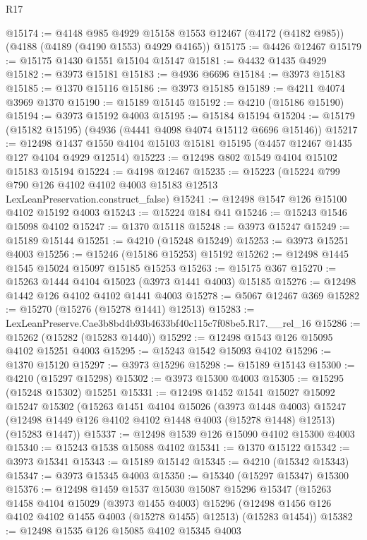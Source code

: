 \begin{lexlean}{R17}
\begin{coremodule}
@15174 := @4148
    @985
    @4929
    @15158
    @1553
    @12467
    (@4172 (@4182 @985))
    (@4188 (@4189 (@4190 @1553) @4929 @4165))
@15175 := @4426 @12467
@15179 := @15175 @1430 @1551 @15104 @15147
@15181 := @4432 @1435 @4929
@15182 := @3973 @15181
@15183 := @4936 @6696
@15184 := @3973 @15183
@15185 := @1370 @15116
@15186 := @3973 @15185
@15189 := @4211 @4074 @3969 @1370
@15190 := @15189 @15145
@15192 := @4210 (@15186 @15190)
@15194 := @3973 @15192 @4003
@15195 := @15184 @15194
@15204 := @15179 (@15182 @15195) (@4936 (@4441 @4098 @4074 @15112 @6696 @15146))
@15217 := @12498 @1437 @1550 @4104 @15103 @15181 @15195 (@4457 @12467 @1435 @127 @4104 @4929 @12514)
@15223 := @12498 @802 @1549 @4104 @15102 @15183 @15194
@15224 := @4198 @12467
@15235 := @15223
    (@15224 @799 @790 @126 @4102 @4102 @4003 @15183 @12513 LexLeanPreservation.construct_false)
@15241 := @12498 @1547 @126 @15100 @4102 @15192 @4003
@15243 := @15224 @184 @41
@15246 := @15243 @1546 @15098 @4102
@15247 := @1370 @15118
@15248 := @3973 @15247
@15249 := @15189 @15144
@15251 := @4210 (@15248 @15249)
@15253 := @3973 @15251 @4003
@15256 := @15246 (@15186 @15253) @15192
@15262 := @12498 @1445 @1545 @15024 @15097 @15185 @15253
@15263 := @15175 @367
@15270 := @15263 @1444 @4104 @15023 (@3973 @1441 @4003) @15185
@15276 := @12498 @1442 @126 @4102 @4102 @1441 @4003
@15278 := @5067 @12467 @369
@15282 := @15270 (@15276 (@15278 @1441) @12513)
@15283 := LexLeanPreserve.Cae3b8bd4b93b4633bf40c115c7f08be5.R17.__rel_16
@15286 := @15262 (@15282 (@15283 @1440))
@15292 := @12498 @1543 @126 @15095 @4102 @15251 @4003
@15295 := @15243 @1542 @15093 @4102
@15296 := @1370 @15120
@15297 := @3973 @15296
@15298 := @15189 @15143
@15300 := @4210 (@15297 @15298)
@15302 := @3973 @15300 @4003
@15305 := @15295 (@15248 @15302) @15251
@15331 := @12498
    @1452
    @1541
    @15027
    @15092
    @15247
    @15302
    (@15263
      @1451
      @4104
      @15026
      (@3973 @1448 @4003)
      @15247
      (@12498 @1449 @126 @4102 @4102 @1448 @4003 (@15278 @1448) @12513)
      (@15283 @1447))
@15337 := @12498 @1539 @126 @15090 @4102 @15300 @4003
@15340 := @15243 @1538 @15088 @4102
@15341 := @1370 @15122
@15342 := @3973 @15341
@15343 := @15189 @15142
@15345 := @4210 (@15342 @15343)
@15347 := @3973 @15345 @4003
@15350 := @15340 (@15297 @15347) @15300
@15376 := @12498
    @1459
    @1537
    @15030
    @15087
    @15296
    @15347
    (@15263
      @1458
      @4104
      @15029
      (@3973 @1455 @4003)
      @15296
      (@12498 @1456 @126 @4102 @4102 @1455 @4003 (@15278 @1455) @12513)
      (@15283 @1454))
@15382 := @12498 @1535 @126 @15085 @4102 @15345 @4003

\end{coremodule}
\end{lexlean}

